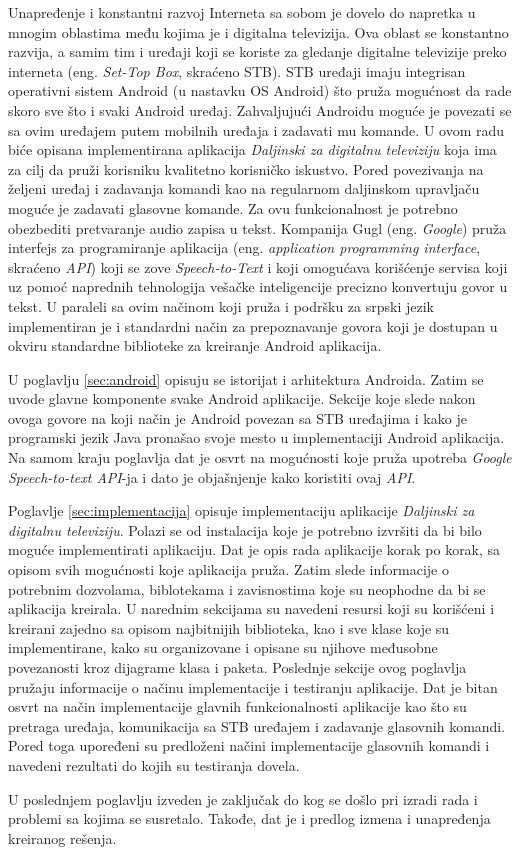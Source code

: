 \documentclass[TamaraIvanovicMasterRad.tex]{subfiles}
\begin{document}
Unapređenje i konstantni razvoj Interneta sa sobom je dovelo do napretka u mnogim oblastima među kojima je i digitalna televizija. Ova oblast se konstantno razvija, a samim tim i uređaji koji se koriste za gledanje digitalne televizije preko interneta (eng. \textit{Set-Top Box}, skraćeno STB). STB uređaji imaju integrisan operativni sistem Android (u nastavku OS Android) \cite{book:oreillycookbook} što pruža mogućnost da rade skoro sve što i svaki Android uređaj. Zahvaljujući Androidu moguće je povezati se sa ovim uređajem putem mobilnih uređaja i zadavati mu komande. U ovom radu biće opisana implementirana aplikacija \textit{Daljinski za digitalnu televiziju} koja ima za cilj da pruži korisniku kvalitetno korisničko iskustvo. Pored povezivanja na željeni uređaj i zadavanja komandi kao na regularnom daljinskom upravljaču moguće je zadavati glasovne komande. Za ovu funkcionalnost je potrebno obezbediti pretvaranje audio zapisa u tekst. Kompanija Gugl (eng. \textit{Google}) pruža interfejs za programiranje aplikacija (eng. \textit{application programming interface}, skraćeno \textit{API}) \cite{sajt:googleCloudApis} koji se zove \textit{Speech-to-Text} \cite{sajt:googleSTT} i koji omogućava korišćenje servisa koji uz pomoć naprednih tehnologija vešačke inteligencije precizno konvertuju govor u tekst. U paraleli sa ovim načinom koji pruža i podršku za srpski jezik implementiran je i standardni način za prepoznavanje govora koji je dostupan u okviru standardne biblioteke za kreiranje Android aplikacija.

U poglavlju \ref{sec:android} opisuju se istorijat i arhitektura Androida. Zatim se uvode glavne komponente svake Android aplikacije. Sekcije koje slede nakon ovoga govore na koji način je Android povezan sa STB uređajima i kako je programski jezik Java pronašao svoje mesto u implementaciji Android aplikacija. Na samom kraju poglavlja dat je osvrt na mogućnosti koje pruža upotreba \textit{Google Speech-to-text API}-ja i dato je objašnjenje kako koristiti ovaj \textit{API}.

Poglavlje \ref{sec:implementacija} opisuje implementaciju aplikacije \textit{Daljinski za digitalnu televiziju}. Polazi se od instalacija koje je potrebno izvršiti da bi bilo moguće implementirati aplikaciju. Dat je opis rada aplikacije korak po korak, sa opisom svih mogućnosti koje aplikacija pruža. Zatim slede informacije o potrebnim dozvolama, biblotekama i zavisnostima koje su neophodne da bi se aplikacija kreirala. U narednim sekcijama su navedeni resursi koji su korišćeni i kreirani zajedno sa opisom najbitnijih biblioteka, kao i sve klase koje su implementirane, kako su organizovane i opisane su njihove međusobne povezanosti kroz dijagrame klasa i paketa. Poslednje sekcije ovog poglavlja pružaju informacije o načinu implementacije i testiranju aplikacije. Dat je bitan osvrt na način implementacije glavnih funkcionalnosti aplikacije kao što su pretraga uređaja, komunikacija sa STB uređajem i zadavanje glasovnih komandi. Pored toga upoređeni su predloženi načini implementacije glasovnih komandi i navedeni rezultati do kojih su testiranja dovela.  

U poslednjem poglavlju izveden je zaključak do kog se došlo pri izradi rada i problemi sa kojima se susretalo. Takođe, dat je i predlog izmena i unapređenja kreiranog rešenja.
\end{document}
